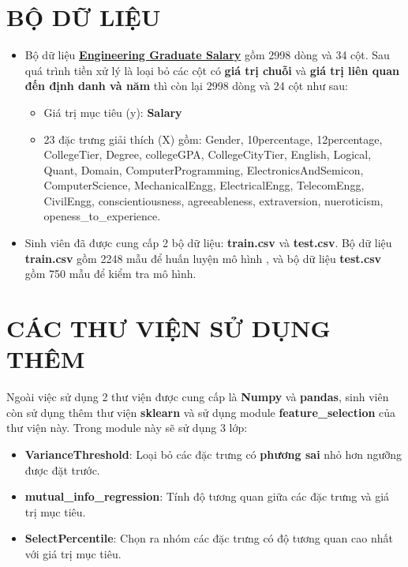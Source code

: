 \documentclass{report}
\begin{document}
\section{BỘ DỮ LIỆU}
\begin{itemize}
    \item  Bộ dữ liệu \textbf{\href{https://www.kaggle.com/datasets/manishkc06/engineering-graduate-salary-prediction}{Engineering Graduate Salary}} gồm 2998 dòng và 34 cột. Sau quá trình tiền xử lý là loại bỏ các cột có \textbf{giá trị chuỗi} và \textbf{giá trị liên quan đến định danh và năm} thì còn lại 2998 dòng và 24 cột như sau:
    \begin{itemize}
        \item Giá trị mục tiêu (y): \textbf{Salary}
        \item 23 đặc trưng giải thích (X) gồm: Gender, 10percentage, 12percentage, CollegeTier, Degree, collegeGPA, CollegeCityTier, English, Logical, Quant, Domain, ComputerProgramming, ElectronicsAndSemicon, ComputerScience, MechanicalEngg, ElectricalEngg, TelecomEngg, CivilEngg, conscientiousness, agreeableness, extraversion, nueroticism, openess\_to\_experience.
    \end{itemize}
    \item Sinh viên đã được cung cấp 2 bộ dữ liệu: \textbf{train.csv} và \textbf{test.csv}. Bộ dữ liệu \textbf{train.csv} gồm 2248 mẫu để huấn luyện mô hình , và bộ dữ liệu \textbf{test.csv} gồm 750 mẫu để kiểm tra mô hình.
\end{itemize}

\section{CÁC THƯ VIỆN SỬ DỤNG THÊM} \label{sec:library}
Ngoài việc sử dụng 2 thư viện được cung cấp là \textbf{Numpy} và \textbf{pandas}, sinh viên còn sử dụng thêm thư viện \textbf{sklearn} và sử dụng module \textbf{feature\_selection} của thư viện này. Trong module này sẽ sử dụng 3 lớp:
\begin{itemize}
    \item \textbf{VarianceThreshold}: Loại bỏ các đặc trưng có \textbf{phương sai} nhỏ hơn ngưỡng được đặt trước.
    \item \textbf{mutual\_info\_regression}: Tính độ tương quan giữa các đặc trưng và giá trị mục tiêu.
    \item \textbf{SelectPercentile}: Chọn ra nhóm các đặc trưng có độ tương quan cao nhất với giá trị mục tiêu.
\end{itemize}
\end{document}
